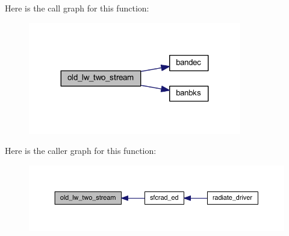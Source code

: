 Here is the call graph for this function\+:\nopagebreak
\begin{figure}[H]
\begin{center}
\leavevmode
\includegraphics[width=263pt]{old__twostream__rad_8f90_abcc634b5076b1fe8fb168a33555a3fd2_cgraph}
\end{center}
\end{figure}




Here is the caller graph for this function\+:\nopagebreak
\begin{figure}[H]
\begin{center}
\leavevmode
\includegraphics[width=350pt]{old__twostream__rad_8f90_abcc634b5076b1fe8fb168a33555a3fd2_icgraph}
\end{center}
\end{figure}


\hypertarget{old__twostream__rad_8f90_ac90aec0e7fa711f6b96d200ae35c737a}{}
